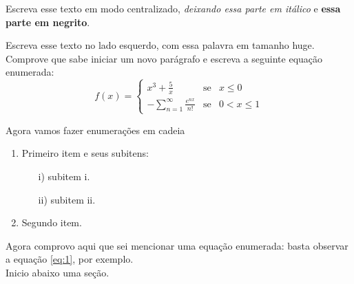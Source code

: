 \documentclass[11pt]{report}
\begin{document}
	\thispagestyle{empty}

	\begin{center}
	Escreva esse texto em modo centralizado, \textit{deixando essa parte em itálico} e \textbf{essa parte em negrito}.
	\end{center}
	
	\hspace*{\fill}Escreva esse texto no lado esquerdo, com essa {\huge palavra} em tamanho huge. \\
	
    Comprove que sabe iniciar um novo parágrafo e escreva a seguinte equação enumerada:
    \begin{equation}
    f(x)=
    \left 
    \{
    \begin{array}{ccl}
    x^3 + \frac{5}{x} & \mbox {se} & x \leq 0 \\
    -\sum\limits_{n=1}^{\infty} \frac{e^{nx}}{n!} & \mbox{se} & 0 < x \leq 1
    \end{array}
    \right. \label{eq:1}
    \end{equation}

	\begin{flushleft}
		Agora vamos fazer enumerações em cadeia
		\begin{enumerate}
			\item Primeiro item e seus subitens:
			\begin{enumerate}
				\item [i)] subitem i.
				\item [ii)] subitem ii.
			\end{enumerate}
			\item Segundo item.
		\end{enumerate}
	
		Agora comprovo aqui que sei mencionar uma equação enumerada: basta observar a equação \eqref{eq:1}, por exemplo.
		\\
		Inicio abaixo uma seção.
	\end{flushleft}
\end{document}
